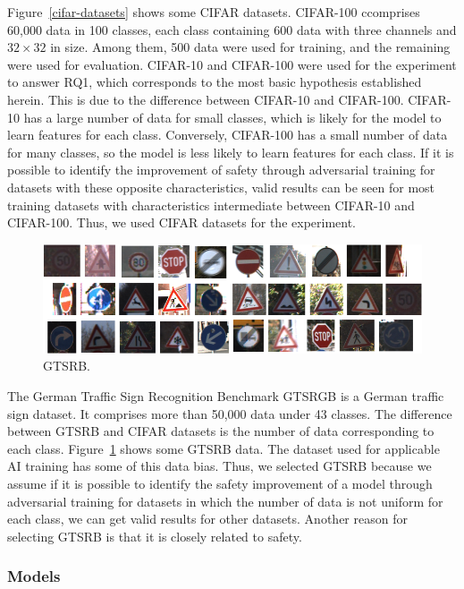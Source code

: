 \documentclass[journal,article,submit,moreauthors,pdftex]{Definitions/mdpi}
\begin{document}
Figure~\ref{cifar-datasets} shows some CIFAR datasets.
CIFAR-100 ccomprises 60,000 data in 100 classes, each class containing 600 data with three channels and \begin{math}{32\times 32}\end{math} in size. Among them, 500 data were used for training, and the remaining were used for evaluation.
CIFAR-10 and CIFAR-100 were used for the experiment to answer RQ1, which corresponds to the most basic hypothesis established herein.
This is due to the difference between CIFAR-10 and CIFAR-100. CIFAR-10 has a large number of data for small classes, which is likely for the model to learn features for each class.
Conversely, CIFAR-100 has a small number of data for many classes, so the model is less likely to learn features for each class.
If it is possible to identify the improvement of safety through adversarial training for datasets with these opposite characteristics, valid results can be seen for most training datasets with characteristics intermediate between CIFAR-10 and CIFAR-100. Thus, we used CIFAR datasets for the experiment.

\begin{figure}[H]
\includegraphics[width=13 cm]{Definitions/gtsrb-dataset.png}
\caption{GTSRB.\label{gtsrb-dataset}}
\end{figure} 

The German Traffic Sign Recognition Benchmark GTSRGB is a German traffic sign dataset. It comprises more than 50,000 data under 43 classes.
The difference between GTSRB and CIFAR datasets is the number of data corresponding to each class.
Figure~\ref{gtsrb-dataset} shows some GTSRB data.
The dataset used for applicable AI training has some of this data bias.
Thus, we selected GTSRB because we assume if it is possible to identify the safety improvement of a model through adversarial training for datasets in which the number of data is not uniform for each class, we can get valid results for other datasets.
Another reason for selecting GTSRB is that it is closely related to safety.

\subsubsection{Models}
\end{document}
